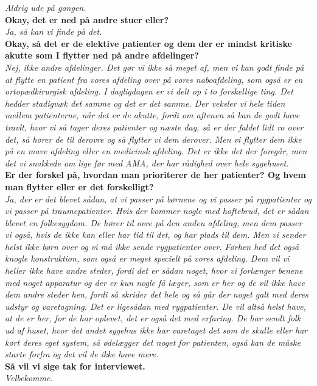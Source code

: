 \noindent
\textit{Aldrig ude på gangen.}\\
\noindent
\textbf{Okay, det er ned på andre stuer eller?}\\
\noindent
\textit{Ja, så kan vi finde på det.}\\
\noindent
\textbf{Okay, så det er de elektive patienter og dem der er mindst kritiske akutte som I flytter ned på andre afdelinger?} \\
\noindent
\textit{Nej, ikke andre afdelinger. Det gør vi ikke så meget af, men vi kan godt finde på at flytte en patient fra vores afdeling over på vores naboafdeling, som også er en ortopædkirurgisk afdeling. I dagligdagen er vi delt op i to forskellige ting. Det hedder stadigvæk det samme og det er det samme. Der veksler vi hele tiden mellem patienterne, når det er de akutte, fordi om aftenen så kan de godt have travlt, hvor vi så tager deres patienter og næste dag, så er der faldet lidt ro over det, så hører de til derovre og så flytter vi dem derover. Men vi flytter dem ikke på en mave afdeling eller en medicinsk afdeling. Det er ikke det der foregår, men det vi snakkede om lige før med AMA, der har rådighed over hele sygehuset.}\\
\noindent
\textbf{Er der forskel på, hvordan man prioriterer de her patienter? Og hvem man flytter eller er det forskelligt?}\\
\noindent
\textit{Ja, der er det blevet sådan, at vi passer på børnene og vi passer på rygpatienter og vi passer på traumepatienter. Hvis der kommer nogle med hoftebrud, det er sådan blevet en folkesygdom. De hører til ovre på den anden afdeling, men dem passer vi også, hvis de ikke kan eller har tid til det, og har plads til dem. Men vi sender helst ikke børn over og vi må ikke sende rygpatienter over. Førhen hed det også knogle konstruktion, som også er meget specielt på vores afdeling. Dem vil vi heller ikke have andre steder, fordi det er sådan noget, hvor vi forlænger benene med noget apparatur og der er kun nogle få læger, som er her og de vil ikke have dem andre steder hen, fordi så skrider det hele og så går der noget galt med deres udstyr og varetagning. Det er ligesådan med rygpatienter. De vil altså helst have, at de er her, for de har oplevet, det er også det med erfaring. De har sendt folk ud af huset, hvor det andet sygehus ikke har varetaget det som de skulle eller har kørt deres eget system, så ødelægger det noget for patienten, også kan de måske starte forfra og det vil de ikke have mere.}\\ 
\noindent
\textbf{Så vil vi sige tak for interviewet.}\\
\noindent
\textit{Velbekomme.}\\


